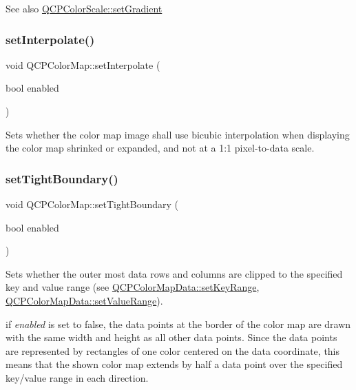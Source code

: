 \begin{DoxySeeAlso}{See also}
\mbox{\hyperlink{class_q_c_p_color_scale_a1f29583bb6f1e7f473b62fb712be3940}{Q\+C\+P\+Color\+Scale\+::set\+Gradient}} 
\end{DoxySeeAlso}
\mbox{\label{class_q_c_p_color_map_a484eaa8a5065cfc386b15375bf98b964}} 
\subsubsection{\texorpdfstring{set\+Interpolate()}{setInterpolate()}}
{\footnotesize\ttfamily void Q\+C\+P\+Color\+Map\+::set\+Interpolate (\begin{DoxyParamCaption}\item[{bool}]{enabled }\end{DoxyParamCaption})}

Sets whether the color map image shall use bicubic interpolation when displaying the color map shrinked or expanded, and not at a 1\+:1 pixel-\/to-\/data scale.

\mbox{\label{class_q_c_p_color_map_ad03221cc285e5f562a0b13d684b5576d}} 
\subsubsection{\texorpdfstring{set\+Tight\+Boundary()}{setTightBoundary()}}
{\footnotesize\ttfamily void Q\+C\+P\+Color\+Map\+::set\+Tight\+Boundary (\begin{DoxyParamCaption}\item[{bool}]{enabled }\end{DoxyParamCaption})}

Sets whether the outer most data rows and columns are clipped to the specified key and value range (see \mbox{\hyperlink{class_q_c_p_color_map_data_a0738c485f3c9df9ea1241b7a8bb6a86e}{Q\+C\+P\+Color\+Map\+Data\+::set\+Key\+Range}}, \mbox{\hyperlink{class_q_c_p_color_map_data_ada1b2680ba96a5f4175b6d341cf75d23}{Q\+C\+P\+Color\+Map\+Data\+::set\+Value\+Range}}).

if {\itshape enabled} is set to false, the data points at the border of the color map are drawn with the same width and height as all other data points. Since the data points are represented by rectangles of one color centered on the data coordinate, this means that the shown color map extends by half a data point over the specified key/value range in each direction.


